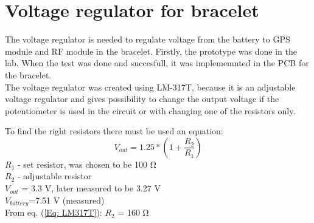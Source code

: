 
\section{Voltage regulator for bracelet}
The voltage regulator is needed to regulate voltage from the battery to GPS module and RF module in the bracelet.
Firstly, the prototype was done in the lab. When the test was done and succesfull, it was implememnted in the PCB for the bracelet.\\
The voltage regulator was created using LM-317T, because it is an adjustable voltage regulator and gives possibility to 
change the output voltage if the potentiometer is used in the circuit or with changing one of the resistors only.  

To find the right resistors there must be used an equation: 
\begin{equation}\label{Eq: LM317T}
    V_{out}=1.25*(1+\frac{R_{2}}{R_{1}})
\end{equation}
$R_1$ - set resistor, was chosen to be 100 Ω \\
$R_2$ - adjustable resistor \\
$V_{out}$ = 3.3 V, later measured to be 3.27 V \\
$V_{battery}$=7.51 V (measured)\\
From eq. (\ref{Eq: LM317T}): $R_2$ = 160 Ω \\

